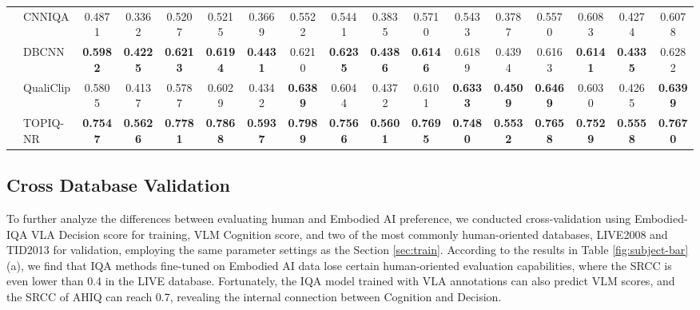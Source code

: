 \documentclass{article}
\newcommand{\CLA}[1]{{\color[HTML]{4472c4} \textbf{#1}}}
\newcommand{\CLB}[1]{{\color[HTML]{E76254} \textbf{#1}}}
\begin{document}
\begin{table}[t]
{\begin{tabular}{l|l|ccc|ccc|ccc|ccc|ccc}
 \\
                      & CNNIQA \cite{quality:CNNIQA}       & \colorbox{gray!20}{0.4871}&\colorbox{gray!20}{0.3362}&0.5207&\colorbox{gray!20}{0.5215}&\colorbox{gray!20}{0.3669}&0.5522&\colorbox{gray!20}{0.5441}&\colorbox{gray!20}{0.3835}&0.5710&\colorbox{gray!20}{0.5433}&\colorbox{gray!20}{0.3787}&0.5570&0.6083&0.4274&0.6078

 \\
                      & DBCNN \cite{quality:DBCNN}        & \CLB{0.5982}&\CLB{0.4225}&\CLB{0.6213}&\CLB{0.6194}&\CLB{0.4431}&0.6210&\CLB{0.6235}&\CLB{0.4386}&\CLB{0.6146}&0.6189&0.4394&0.6163&\CLB{0.6141}&\CLB{0.4335}&0.6282

\\
                      & QualiClip \cite{quality:qualiclip} &0.5805&0.4137&0.5787&0.6029&0.4342&\CLB{0.6389}&0.6044&0.4372&0.6101&\CLB{0.6333}&\CLB{0.4509}&\CLB{0.6469}&0.6030&0.4265&\CLB{0.6399}

 \\
                      & TOPIQ-NR \cite{quality:topiq}     & \CLA{0.7547}&\CLA{0.5626}&\CLA{0.7781}&\CLA{0.7868}&\CLA{0.5937}&\CLA{0.7989}&\CLA{0.7566}&\CLA{0.5601}&\CLA{0.7695}&\CLA{0.7480}&\CLA{0.5532}&\CLA{0.7658}&\CLA{0.7529}&\CLA{0.5558}&\CLA{0.7670}

 \\ \bottomrule
\end{tabular}}
\vspace{-4mm}
\end{table}

\subsection{Cross Database Validation}

To further analyze the differences between evaluating human and Embodied AI preference, we conducted cross-validation using Embodied-IQA VLA Decision score for training, VLM Cognition score, and two of the most commonly human-oriented databases, LIVE2008 \cite{dataset:live} and TID2013 \cite{dataset:tid} for validation, employing the same parameter settings as the Section \ref{sec:train}.
According to the results in Table \ref{fig:subject-bar} (a), we find that IQA methods fine-tuned on Embodied AI data lose certain human-oriented evaluation capabilities, where the SRCC is even lower than 0.4 in the LIVE database. 
Fortunately, the IQA model trained with VLA annotations can also predict VLM scores, and the SRCC of AHIQ can reach 0.7, revealing the internal connection between Cognition and Decision.
\end{document}
